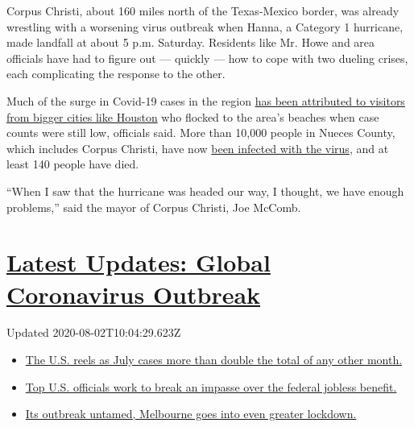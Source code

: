 Corpus Christi, about 160 miles north of the Texas-Mexico border, was
already wrestling with a worsening virus outbreak when Hanna, a Category
1 hurricane, made landfall at about 5 p.m. Saturday. Residents like Mr.
Howe and area officials have had to figure out --- quickly --- how to
cope with two dueling crises, each complicating the response to the
other.

Much of the surge in Covid-19 cases in the region
\href{https://www.nytimes.com/2020/07/11/us/coronavirus-texas-corpus-christi.html}{has
been attributed to visitors from bigger cities like Houston} who flocked
to the area's beaches when case counts were still low, officials said.
More than 10,000 people in Nueces County, which includes Corpus Christi,
have now
\href{https://www.nytimes.com/interactive/2020/us/texas-coronavirus-cases.html}{been
infected with the virus}, and at least 140 people have died.

``When I saw that the hurricane was headed our way, I thought, we have
enough problems,'' said the mayor of Corpus Christi, Joe McComb.

\hypertarget{latest-updates-global-coronavirus-outbreak}{%
\section{\texorpdfstring{\href{https://www.nytimes.com/2020/08/01/world/coronavirus-covid-19.html?action=click\&pgtype=Article\&state=default\&region=MAIN_CONTENT_1\&context=storylines_live_updates}{Latest
Updates: Global Coronavirus
Outbreak}}{Latest Updates: Global Coronavirus Outbreak}}\label{latest-updates-global-coronavirus-outbreak}}

Updated 2020-08-02T10:04:29.623Z

\begin{itemize}
\tightlist
\item
  \href{https://www.nytimes.com/2020/08/01/world/coronavirus-covid-19.html?action=click\&pgtype=Article\&state=default\&region=MAIN_CONTENT_1\&context=storylines_live_updates\#link-34047410}{The
  U.S. reels as July cases more than double the total of any other
  month.}
\item
  \href{https://www.nytimes.com/2020/08/01/world/coronavirus-covid-19.html?action=click\&pgtype=Article\&state=default\&region=MAIN_CONTENT_1\&context=storylines_live_updates\#link-780ec966}{Top
  U.S. officials work to break an impasse over the federal jobless
  benefit.}
\item
  \href{https://www.nytimes.com/2020/08/01/world/coronavirus-covid-19.html?action=click\&pgtype=Article\&state=default\&region=MAIN_CONTENT_1\&context=storylines_live_updates\#link-2bc8948}{Its
  outbreak untamed, Melbourne goes into even greater lockdown.}
\end{itemize}

